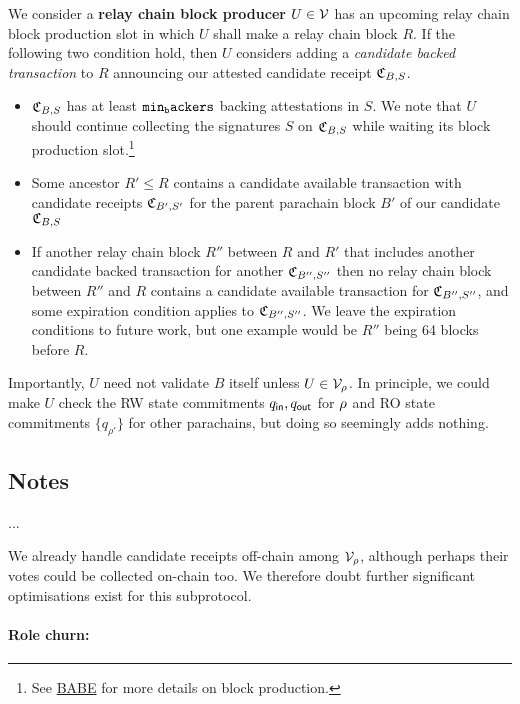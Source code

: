 We consider a {\bf relay chain block producer} $U \in \mathcal{V}$ has an upcoming relay chain block production slot in which $U$ shall make a relay chain block $R$.  If the following two condition hold, then $U$ considers adding a {\em candidate backed transaction} to $R$ announcing our attested candidate receipt $\mathfrak{C}_{B,S}$.
\begin{itemize}
%
\item $\mathfrak{C}_{B,S}$ has at least $\mathtt{min_backers}$ backing attestations in $S$.  We note that $U$ should continue collecting the signatures $S$ on $\mathfrak{C}_{B,S}$ while waiting its block production slot.\footnote{See \href{http://research.web3.foundation/en/latest/polkadot/BABE/Babe/}{BABE} for more details on block production.}
%
\item Some ancestor $R' \le R$ contains a candidate available transaction with candidate receipts $\mathfrak{C}_{B',S'}$ for the parent parachain block $B'$ of our candidate $\mathfrak{C}_{B,S}$
%
\item If another relay chain block $R''$ between $R$ and $R'$ that includes another candidate backed transaction for another $\mathfrak{C}_{B'',S''}$ then no relay chain block between $R''$ and $R$ contains a candidate available transaction for $\mathfrak{C}_{B'',S''}$, and some expiration condition applies to $\mathfrak{C}_{B'',S''}$.  
We leave the expiration conditions to future work, but one example would be $R''$ being 64 blocks before $R$.
%
\end{itemize}
Importantly, $U$ need not validate $B$ itself unless $U \in \mathcal{V}_{\rho}$.  In principle, we could make $U$ check the RW state commitments $q_{\mathsf{in}},q_{\mathsf{out}}$ for $\rho$ and RO state commitments $\{ q_{\rho'} \}$ for other parachains, but doing so seemingly adds nothing.


\subsection{Notes}

...

We already handle candidate receipts off-chain among $\mathcal{V}_{\rho}$, although perhaps their votes could be collected on-chain too.  We therefore doubt further significant optimisations exist for this subprotocol.

\smallskip
\paragraph{Role churn:}

